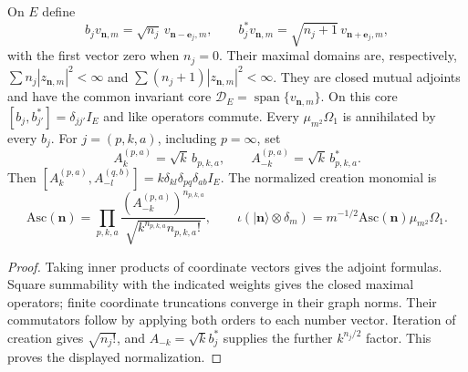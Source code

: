 \begin{proposition}
\label{v4-arith:consumer56:CCR}
On $E$ define
\[
 b_jv_{\mathbf n,m}=\sqrt{n_j}\,v_{\mathbf n-\mathbf e_j,m},\qquad
 b_j^*v_{\mathbf n,m}=\sqrt{n_j+1}\,v_{\mathbf n+\mathbf e_j,m},
\]
with the first vector zero when $n_j=0$. Their maximal domains are,
respectively, $\sum n_j|z_{\mathbf n,m}|^2<\infty$ and
$\sum(n_j+1)|z_{\mathbf n,m}|^2<\infty$. They are closed mutual
adjoints and have the common invariant core
$\mathcal D_E=\operatorname{span}\{v_{\mathbf n,m}\}$.
On this core $[b_j,b_{j'}^*]=\delta_{jj'}I_E$ and like operators
commute. Every $\mu_{m^2}\Omega_1$ is annihilated by every $b_j$.
For $j=(p,k,a)$, including $p=\infty$, set
\[
 A_k^{(p,a)}=\sqrt{k}\,b_{p,k,a},\qquad
 A_{-k}^{(p,a)}=\sqrt{k}\,b_{p,k,a}^*.
\]
Then $[A_k^{(p,a)},A_{-l}^{(q,b)}]=k\delta_{kl}\delta_{pq}\delta_{ab}I_E$.
The normalized creation monomial is
\[
 \mathrm{Asc}(\mathbf n)=
 \prod_{p,k,a}\frac{(A_{-k}^{(p,a)})^{n_{p,k,a}}}
 {\sqrt{k^{n_{p,k,a}}n_{p,k,a}!}},\qquad
 \iota(|\mathbf n\rangle\otimes\delta_m)
 =m^{-1/2}\mathrm{Asc}(\mathbf n)\mu_{m^2}\Omega_1.
\]
\end{proposition}
\begin{proof}
Taking inner products of coordinate vectors gives the adjoint
formulas. Square summability with the indicated weights gives the
closed maximal operators; finite coordinate truncations converge in
their graph norms. Their commutators follow by applying both orders
to each number vector. Iteration of creation gives
$\sqrt{n_j!}$, and $A_{-k}=\sqrt{k}b_j^*$ supplies the further
$k^{n_j/2}$ factor. This proves the displayed normalization.
\end{proof}

